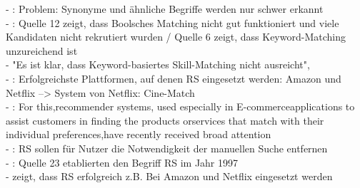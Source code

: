 - \cite{mitre:2014}: Problem: Synonyme und ähnliche Begriffe werden nur schwer erkannt \\
- \cite{enhancingERecruitment:2012}: Quelle 12 zeigt, dass Boolsches Matching nicht gut funktioniert und viele Kandidaten nicht rekrutiert wurden / Quelle 6 zeigt, dass Keyword-Matching unzureichend ist \\
- "Es ist klar, dass Keyword-basiertes Skill-Matching nicht ausreicht", \cite{prospect:2010} \\
- \cite{aCollaborativeRecommenderSystemCourses:2016}: Erfolgreichste Plattformen, auf denen RS eingesetzt werden: Amazon und Netflix --> System von Netflix: Cine-Match \\
- \cite{malinowski:2008}: For this,recommender systems, used especially in E-commerceapplications to assist customers in finding the products orservices that match with their individual preferences,have recently received broad attention \\
- \cite{comibingCareer:2013}: RS sollen für Nutzer die Notwendigkeit der manuellen Suche entfernen \\
- \cite{malinowski:2006}: Quelle 23 etablierten den Begriff RS im Jahr 1997 \\
- \cite[S. 1]{enhancingERecruitment:2012} zeigt, dass RS erfolgreich z.B. Bei Amazon und Netflix eingesetzt werden \\


